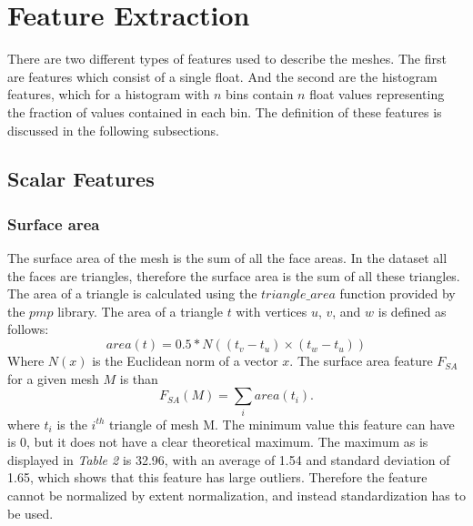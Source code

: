 \documentclass{bigdata}
\begin{document}
\section{Feature Extraction}

There are two different types of features used to describe the meshes. The first are features which consist of a single float. And the second are the histogram features, which for a histogram with $n$ bins contain $n$ float values representing the fraction of values contained in each bin. The definition of these features is discussed in the following subsections.
\subsection{Scalar Features}

\subsubsection{Surface area}
The surface area of the mesh is the sum of all the face areas. In the dataset all the faces are triangles, therefore the surface area is the sum of all these triangles. The area of a triangle is calculated using the $triangle\_area$ function provided by the $pmp$ library. The area of a triangle $t$ with vertices $u$, $v$, and $w$ is defined as follows:
\begin{equation}
area(t) = 0.5 * N((t_v-t_u) \times (t_w-t_u))
\end{equation}
Where $N(x)$ is the Euclidean norm of a vector $x$. The surface area feature $F_{SA}$ for a given mesh $M$ is than
\begin{equation}
F_{SA}(M) = \sum\limits_{i} area(t_i).
\end{equation}
where $t_i$ is the $i^{th}$ triangle of mesh M. The minimum value this feature can have is 0, but it does not have a clear theoretical maximum. The maximum as is displayed in \textit{Table 2} is 32.96, with an average of 1.54 and standard deviation of 1.65, which shows that this feature has large outliers. Therefore the feature cannot be normalized by extent normalization, and instead standardization has to be used. 
\end{document}
